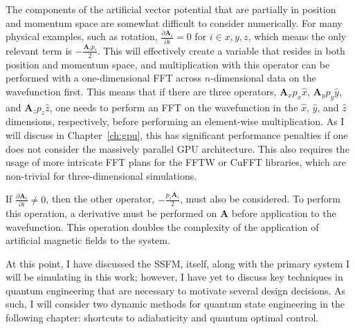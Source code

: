 The components of the artificial vector potential that are partially in position and momentum space are somewhat difficult to consider numerically.
For many physical examples, such as rotation, $\frac{\partial \mathbf{A}_i}{\partial i} = 0$ for $i \in {x, y, z}$, which means the only relevant term is $-\frac{\mathbf{A}_i p_i}{2}$.
This will effectively create a variable that resides in both position and momentum space, and multiplication with this operator can be performed with a one-dimensional FFT across $n$-dimensional data on the wavefunction first.
This means that if there are three operators, $\mathbf{A}_x p_x\hat x$, $\mathbf{A}_y p_y\hat y$, and $\mathbf{A}_z p_z\hat z$, one needs to perform an FFT on the wavefunction in the $\hat x$, $\hat y$, and $\hat z$ dimensions, respectively, before performing an element-wise multiplication. 
As I will discuss in Chapter~\ref{ch:gpu}, this has significant performance penalties if one does not consider the massively parallel GPU architecture.
This also requires the usage of more intricate FFT plans for the FFTW or CuFFT libraries, which are non-trivial for three-dimensional simulations.

If $\frac{\partial \mathbf{A}_i}{\partial i} \neq 0$, then the other operator, $-\frac{p_i\mathbf{A}_i}{2}$, must also be considered.
To perform this operation, a derivative must be performed on $\mathbf{A}$ before application to the wavefunction. 
This operation doubles the complexity of the application of artificial magnetic fields to the system.

At this point, I have discussed the SSFM, itself, along with the primary system I will be simulating in this work; however, I have yet to discuss key techniques in quantum engineering that are necessary to motivate several design decisions.
As such, I will consider two dynamic methods for quantum state engineering in the following chapter: shortcuts to adiabaticity and quantum optimal control.
